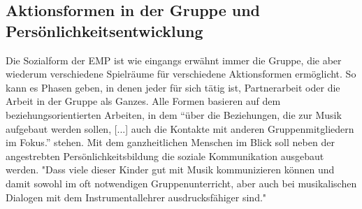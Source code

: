\subsection{Aktionsformen in der Gruppe und Persönlichkeitsentwicklung}
Die Sozialform der EMP ist wie eingangs erwähnt immer die Gruppe, die aber
wiederum verschiedene Spielräume für verschiedene Aktionsformen ermöglicht. So
kann es Phasen geben, in denen jeder für sich tätig ist, Partnerarbeit oder die
Arbeit in der Gruppe als Ganzes. Alle Formen basieren auf dem
beziehungsorientierten Arbeiten, in dem \enquote{über die Beziehungen, die zur Musik
aufgebaut werden sollen, [...] auch die Kontakte mit anderen Gruppenmitgliedern
im Fokus.} \autocite[10]{dartsch:kern_des_musizierens} stehen. Mit dem
ganzheitlichen Menschen im Blick soll neben der angestrebten
Persönlichkeitsbildung die soziale Kommunikation ausgebaut werden. "Dass viele
dieser Kinder gut mit Musik kommunizieren können und damit sowohl im oft
notwendigen Gruppenunterricht, aber auch bei musikalischen Dialogen mit dem
Instrumentallehrer ausdrucksfähiger sind." %












